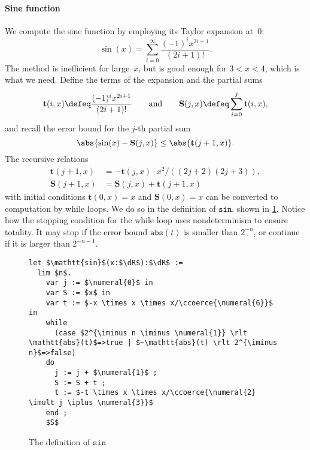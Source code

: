 \paragraph*{Sine function}

We compute the sine function by employing its Taylor expansion at~$0$:
%
\begin{equation*}
  \sin(x) = \sum_{i = 0}^\infty \frac{(-1)^i x^{2i+1}}{(2i+1)!}.
\end{equation*}
%
The method is inefficient for large~$x$, but is good enough for $3 < x < 4$, which is what we need.
%
Define the terms of the expansion and the partial sums
%
\begin{equation*}
  \mathbf{t}(i, x) \defeq \frac{(-1)^i x^{2i+1}}{(2i+1)!}
  \qquad\text{and}\qquad
  \mathbf{S}(j, x) \defeq \sum_{i=0}^j \mathbf{t}(i, x),
\end{equation*}
%
and recall the error bound for the $j$-th partial sum
%
\begin{equation}
  \label{eq:exa:sine-bound}
  \abs{\sin(x) - \mathbf{S}(j,x)} \leq \abs{\mathbf{t}(j+1, x)}.
\end{equation}
%
The recursive relations
%
\begin{align*}
  \mathbf{t}(j+1, x) &= -\mathbf{t}(j, x) \cdot x^2 / ((2j + 2)(2j + 3)), \\
  \mathbf{S}(j + 1, x) &= \mathbf{S}(j, x) + \mathbf{t}(j + 1, x)
\end{align*}
%
with initial conditions $\mathbf{t}(0, x) = x$ and $\mathbf{S}(0, x) = x$ can be converted to computation by while loops. We do so in the definition of $\mathtt{sin}$, shown in \cref{fig:sin-def}.
%
Notice how the stopping condition for the while loop uses nondeterminism to ensure totality. It may stop if the error bound $\mathtt{abs}(t)$ is smaller than $2^{-n}$, or continue if it is larger than $2^{-n-1}$.
%
\begin{figure}
  \centering
  \begin{mdframed}
  \small
\begin{lstlisting}
let $\mathtt{sin}$(x:$\dR$):$\dR$ :=
  lim $n$.
    var j := $\numeral{0}$ in
    var S := $x$ in
    var t := $-x \times x \times x/\ccoerce{\numeral{6}}$ in
    while
      (case $2^{\iminus n \iminus \numeral{1}} \rlt \mathtt{abs}(t)$=>true | $~\mathtt{abs}(t) \rlt 2^{\iminus n}$=>false)
    do
      j := j + $\numeral{1}$ ;
      S := S + t ;
      t := $-t \times x \times x/\ccoerce{\numeral{2} \imult j \iplus \numeral{3}}$
    end ;
    $S$
\end{lstlisting}
  \end{mdframed}
  \caption{The definition of $\mathtt{sin}$}
  \label{fig:sin-def}
\end{figure}

